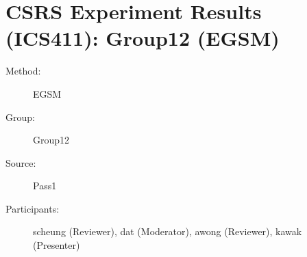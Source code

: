 \chapter {CSRS Experiment Results (ICS411): Group12 (EGSM)}
\small
	  

\begin{description}
\item [Method:] EGSM
\item [Group:] Group12
\item [Source:] Pass1
\item [Participants:] scheung (Reviewer), dat (Moderator), awong (Reviewer), kawak (Presenter)
\end{description}
